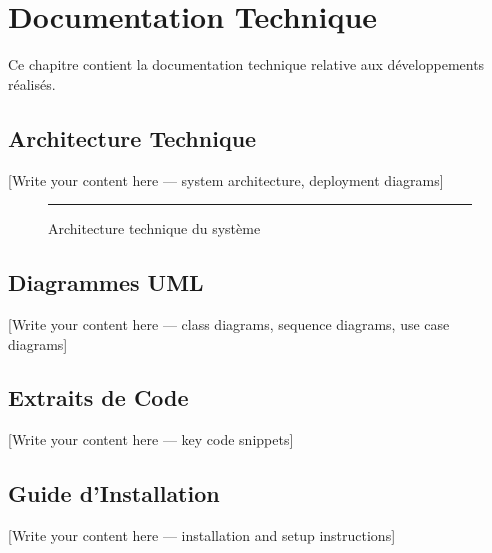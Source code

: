 
\chapter{Documentation Technique}
\label{app:technical}

Ce chapitre contient la documentation technique relative aux développements réalisés.

\section{Architecture Technique}
\label{sec:tech-architecture}

[Write your content here — system architecture, deployment diagrams]

\begin{figure}[H]
  \centering
  \rule{0.9\textwidth}{5cm} %
  \caption{Architecture technique du système}
  \label{fig:architecture-diagram}
\end{figure}

\section{Diagrammes UML}
\label{sec:uml-diagrams}

[Write your content here — class diagrams, sequence diagrams, use case diagrams]

\section{Extraits de Code}
\label{sec:code-snippets}

[Write your content here — key code snippets]

\section{Guide d'Installation}
\label{sec:installation-guide}

[Write your content here — installation and setup instructions]
